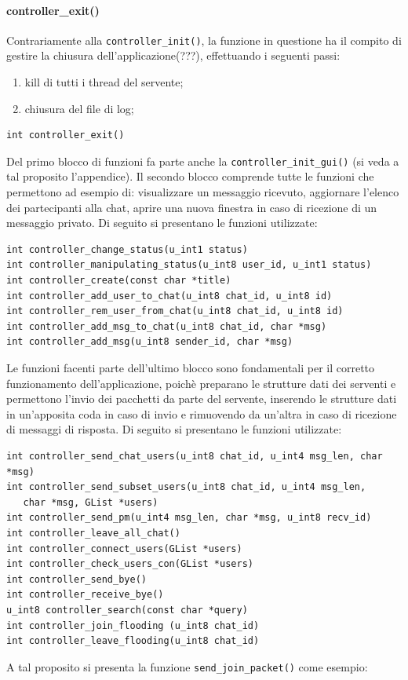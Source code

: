 \paragraph{controller\_exit()}
Contrariamente alla \texttt{controller\_init()}, la funzione in questione ha il compito di gestire la chiusura dell'applicazione(???), effettuando i seguenti passi:
\begin{enumerate}
\item kill di tutti i thread del servente;
\item chiusura del file di log;
\end{enumerate}
\begin{lstlisting}
int controller_exit()
\end{lstlisting}
Del primo blocco di funzioni fa parte anche la \texttt{controller\_init\_gui()} (si veda a tal proposito l'appendice). Il secondo blocco comprende tutte le funzioni che permettono ad esempio di: visualizzare un messaggio ricevuto, aggiornare l'elenco dei partecipanti alla chat, aprire una nuova finestra in caso di ricezione di un messaggio privato. Di seguito si presentano le funzioni utilizzate:
\begin{lstlisting}
int controller_change_status(u_int1 status)
int controller_manipulating_status(u_int8 user_id, u_int1 status)
int controller_create(const char *title)
int controller_add_user_to_chat(u_int8 chat_id, u_int8 id)
int controller_rem_user_from_chat(u_int8 chat_id, u_int8 id)
int controller_add_msg_to_chat(u_int8 chat_id, char *msg)
int controller_add_msg(u_int8 sender_id, char *msg)
\end{lstlisting}
Le funzioni facenti parte dell'ultimo blocco sono fondamentali per il corretto funzionamento dell'applicazione, poichè preparano le strutture dati dei serventi e permettono l'invio dei pacchetti da parte del servente, inserendo le strutture dati in un'apposita coda in caso di invio e rimuovendo da un'altra in caso di ricezione di messaggi di risposta.
Di seguito si presentano le funzioni utilizzate:
\begin{lstlisting}
int controller_send_chat_users(u_int8 chat_id, u_int4 msg_len, char *msg)
int controller_send_subset_users(u_int8 chat_id, u_int4 msg_len, 
   char *msg, GList *users)
int controller_send_pm(u_int4 msg_len, char *msg, u_int8 recv_id)
int controller_leave_all_chat()
int controller_connect_users(GList *users)
int controller_check_users_con(GList *users)
int controller_send_bye()
int controller_receive_bye()
u_int8 controller_search(const char *query)
int controller_join_flooding (u_int8 chat_id)
int controller_leave_flooding(u_int8 chat_id)
\end{lstlisting}
A tal proposito si presenta la funzione \texttt{send\_join\_packet()} come esempio:
